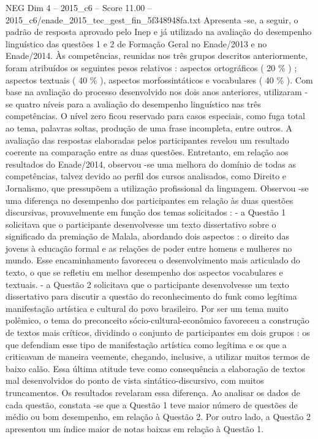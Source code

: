 \begin{textsample}{NEG Dim 4 – 2015\_c6 – Score 11.00 – 2015\_c6/enade\_2015\_tec\_gest\_fin\_5f348948fa.txt}
Apresenta -se, a seguir, o padrão de resposta aprovado pelo Inep e já utilizado na avaliação do desempenho linguístico das questões 1 e 2 de Formação Geral no Enade/2013 e no Enade/2014.
Às competências, reunidas nos três grupos descritos anteriormente, foram atribuídos os seguintes pesos relativos : aspectos ortográficos ( 20 \% ) ; aspectos textuais ( 40 \% ), aspectos morfossintáticos e vocabulares ( 40 \% ).
Com base na avaliação do processo desenvolvido nos dois anos anteriores, utilizaram -se quatro níveis para a avaliação do desempenho linguístico nas três competências.
O nível zero ficou reservado para casos especiais, como fuga total ao tema, palavras soltas, produção de uma frase incompleta, entre outros.
A avaliação das respostas elaboradas pelos participantes revelou um resultado coerente na comparação entre as duas questões.
Entretanto, em relação aos resultados do Enade/2014, observou -se uma melhora do domínio de todas as competências, talvez devido ao perfil dos cursos analisados, como Direito e Jornalismo, que pressupõem a utilização profissional da linguagem.
Observou -se uma diferença no desempenho dos participantes em relação às duas questões discursivas, provavelmente em função dos temas solicitados : - a Questão 1 solicitava que o participante desenvolvesse um texto dissertativo sobre o significado da premiação de Malala, abordando dois aspectos : o direito das jovens à educação formal e as relações de poder entre homens e mulheres no mundo.
Esse encaminhamento favoreceu o desenvolvimento mais articulado do texto, o que se refletiu em melhor desempenho dos aspectos vocabulares e textuais. - a Questão 2 solicitava que o participante desenvolvesse um texto dissertativo para discutir a questão do reconhecimento do funk como legítima manifestação artística e cultural do povo brasileiro.
Por ser um tema muito polêmico, o tema do preconceito sócio-cultural-econômico favoreceu a construção de textos mais críticos, dividindo o conjunto de participantes em dois grupos : os que defendiam esse tipo de manifestação artística como legítima e os que a criticavam de maneira veemente, chegando, inclusive, a utilizar muitos termos de baixo calão.
Essa última atitude teve como consequência a elaboração de textos mal desenvolvidos do ponto de vista sintático-discursivo, com muitos truncamentos.
Os resultados revelaram essa diferença.
Ao analisar os dados de cada questão, constata -se que a Questão 1 teve maior número de questões de médio ou bom desempenho, em relação à Questão 2.
Por outro lado, a Questão 2 apresentou um índice maior de notas baixas em relação à Questão 1.

\end{textsample}
